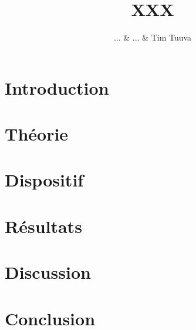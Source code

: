 \documentclass[a4paper,12pt,oneside]{article}
\begin{document}
\title{XXX}%
\author{... \& ... \& Tim Tuuva}

\maketitle
\tableofcontents
\baselineskip=16pt
\parindent=15pt
\parskip=5pt

\begin{abstract}

\end{abstract}

\section{Introduction}

\section{Théorie}


\section{Dispositif}



\section{Résultats}


\section{Discussion}


\section{Conclusion}


\begin{thebibliography}{99}
\end{thebibliography}
\end{document}
